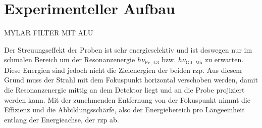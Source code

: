 \chapter{Experimenteller Aufbau}
MYLAR FILTER MIT ALU


\noindent
Der Streuungseffekt der Proben ist sehr energieselektiv und ist deswegen nur im schmalen Bereich um der Resonanzenergie $h\nu_{\text{Fe, L3}}$ bzw. $h\nu_{\text{Gd, M5}}$ zu erwarten. Diese Energien sind jedoch nicht die Zielenergien der beiden \gls{rzp}. Aus diesem Grund muss der Strahl mit dem Fokuspunkt horizontal verschoben werden, damit die Resonanzenergie mittig an dem Detektor liegt und an die Probe projiziert werden kann. Mit der zunehmenden Entfernung von der Fokuspunkt nimmt die Effizienz und die Abbildungsschärfe, also der Energiebereich pro Längeeinheit entlang der Energieachse, der \gls{rzp} ab.


